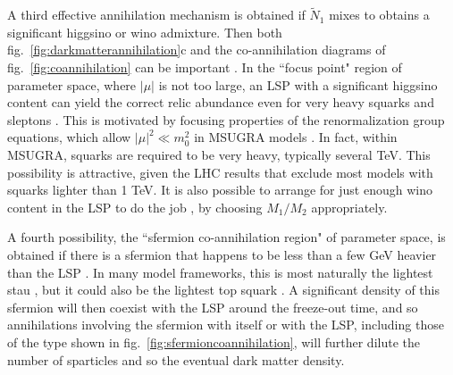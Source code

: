 \documentclass[11pt]{article}
\def\stilde{\widetilde}
\begin{document}
A third effective annihilation mechanism is obtained if $\stilde N_1$ 
mixes to obtains a significant higgsino or wino admixture. Then both 
fig.~\ref{fig:darkmatterannihilation}c and the co-annihilation diagrams of 
fig.~\ref{fig:coannihilation} can be important 
\cite{EdsjoGondolo}. In the ``focus point" region of parameter space, 
where $|\mu|$ is not too large, an LSP with a significant higgsino content 
can yield the correct relic abundance even for very heavy squarks and 
sleptons \cite{focuspointDM}. This is motivated by focusing properties of 
the renormalization group equations, which allow $|\mu|^2 \ll m_0^2$ in 
MSUGRA models \cite{hyperbolic,focuspoint}. In fact, within MSUGRA, squarks are required to be 
very heavy, typically several TeV. This possibility is attractive, given the 
LHC results that exclude most models with squarks lighter than 1 TeV.
It is also possible to arrange for just enough wino content in the LSP to do the 
job \cite{winocontentDM}, by choosing $M_1/M_2$ appropriately.

A fourth possibility, the ``sfermion co-annihilation region" of parameter 
space, is obtained if there is a sfermion that happens to be less than a 
few GeV heavier than the LSP \cite{GriestSeckel}. In many model 
frameworks, this is most naturally the lightest stau 
\cite{staucoannihilation}, but it could also be the lightest top squark 
\cite{stopcoannihilation}. A significant density of this sfermion will 
then coexist with the LSP around the freeze-out time, and so annihilations 
involving the sfermion with itself or with the LSP, including those of the 
type shown in fig.~\ref{fig:sfermioncoannihilation}, will further dilute 
the number of sparticles and so the eventual dark matter density.
\end{document}
